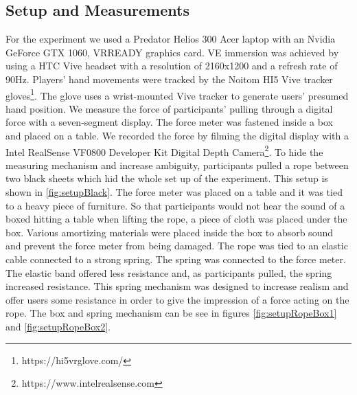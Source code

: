 \subsection{Setup and Measurements}
For the experiment we used a Predator Helios 300 Acer laptop with an Nvidia GeForce GTX 1060, VRREADY graphics card. VE immersion was achieved by using a HTC Vive headset with a resolution of 2160x1200 and a refresh rate of 90Hz. 
Players' hand movements were tracked by the Noitom HI5 Vive tracker gloves\footnote{https://hi5vrglove.com/}. The glove uses a wrist-mounted Vive tracker to generate users' presumed hand position. 
We measure the force of participants' pulling through a digital force  with a seven-segment display. The force meter was fastened inside a box and placed on a table. We recorded the force by filming the digital display with a Intel RealSense VF0800 Developer Kit Digital Depth Camera\footnote{https://www.intelrealsense.com}.
To hide the measuring mechanism and increase ambiguity, participants pulled a rope between two black sheets which hid the whole set up of the experiment. This setup is shown in \ref{fig:setupBlack}. The force meter was placed on a table and it was tied to a heavy piece of furniture. So that participants would not hear the sound of a boxed hitting a table when lifting the rope, a piece of cloth was placed under the box. Various amortizing materials were placed inside the box to absorb sound and prevent the force meter from being damaged. The rope was tied to an elastic cable connected to a strong spring. The spring was connected to the force meter. The elastic band offered less resistance and, as participants pulled, the spring increased resistance. This spring mechanism was designed to increase realism and offer users some resistance in order to give the impression of a force acting on the rope. The box and spring mechanism can be see in figures \ref{fig:setupRopeBox1} and \ref{fig:setupRopeBox2}.\\


